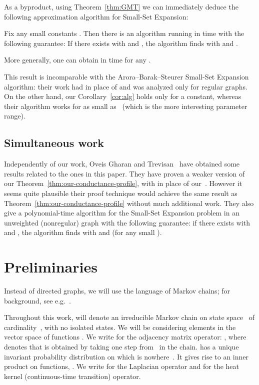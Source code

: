 \documentclass[11pt]{article}
\begin{document}
{As a byproduct, using Theorem~\ref{thm:GMT} we can immediately deduce the following approximation algorithm for Small-Set Expansion:
\begin{corollary} \label{cor:alg}
    Fix any small constants .  Then there is an algorithm running in time  with the following guarantee:  If there exists  with  and , the algorithm finds  with  and .

    More generally, one can obtain  in time  for any .
\end{corollary}

This result is incomparable with the Arora--Barak--Steurer Small-Set Expansion algorithm: their work had  in place of  and was analyzed only for regular graphs. On the other hand, our Corollary~\ref{cor:alg} holds only for  a constant, whereas their algorithm works for  as small as~ (which is the more interesting parameter range).

\subsection{Simultaneous work}
Independently of our work, Oveis Gharan and Trevisan~\cite{OT12} have obtained some results related to the ones in this paper.  They have proven a weaker version of our Theorem~\ref{thm:our-conductance-profile}, with  in place of our~.  However it seems quite plausible their proof technique would achieve the same result as Theorem~\ref{thm:our-conductance-profile} without much additional work.  They also give a polynomial-time algorithm for the Small-Set Expansion problem in an unweighted (nonregular) graph  with the following guarantee:  if there exists  with  and , the algorithm finds  with  and  (for any small ).
}



\section{Preliminaries}                 \label{sec:prelims}
Instead of directed graphs, we will use the language of Markov chains; for background, see e.g.~\cite{DS96,MT06}.

Throughout this work,  will denote an irreducible Markov chain on state space~ of cardinality~, with no isolated states.  We will be considering elements  in the vector space of functions . We  write  for the adjacency matrix operator: , where  denotes that  is obtained by taking one step from~ in the chain.   has a unique invariant probability distribution  on  which is nowhere~. It gives rise to an inner product on functions, .  We write   for the Laplacian operator and  for the heat kernel (continuous-time transition) operator.
\end{document}
